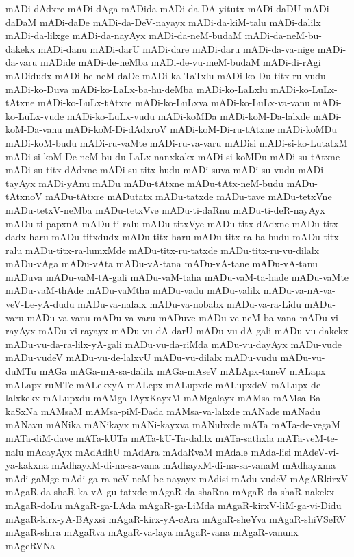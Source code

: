 {mADi-dAdxre
mADi-dAga
mADida
mADi-da-DA-yitutx
mADi-daDU
mADi-daDaM
mADi-daDe
mADi-da-DeV-nayayx
mADi-da-kiM-talu
mADi-dalilx
mADi-da-lilxge
mADi-da-nayAyx
mADi-da-neM-budaM
mADi-da-neM-bu-dakekx
mADi-danu
mADi-darU
mADi-dare
mADi-daru
mADi-da-va-nige
mADi-da-varu
mADide
mADi-de-neMba
mADi-de-vu-meM-budaM
mADi-di-rAgi
mADidudx
mADi-he-neM-daDe
mADi-ka-TaTxlu
mADi-ko-Du-titx-ru-vudu
mADi-ko-Duva
mADi-ko-LaLx-ba-hu-deMba
mADi-ko-LaLxlu
mADi-ko-LuLx-tAtxne
mADi-ko-LuLx-tAtxre
mADi-ko-LuLxva
mADi-ko-LuLx-va-vanu
mADi-ko-LuLx-vude
mADi-ko-LuLx-vudu
mADi-koMDa
mADi-koM-Da-lalxde
mADi-koM-Da-vanu
mADi-koM-Di-dAdxroV
mADi-koM-Di-ru-tAtxne
mADi-koMDu
mADi-koM-budu
mADi-ru-vaMte
mADi-ru-va-varu
mADisi
mADi-si-ko-LutatxM
mADi-si-koM-De-neM-bu-du-LaLx-nanxkakx
mADi-si-koMDu
mADi-su-tAtxne
mADi-su-titx-dAdxne
mADi-su-titx-hudu
mADi-suva
mADi-su-vudu
mADi-tayAyx
mADi-yAnu
mADu
mADu-tAtxne
mADu-tAtx-neM-budu
mADu-tAtxnoV
mADu-tAtxre
mADutatx
mADu-tatxde
mADu-tave
mADu-tetxVne
mADu-tetxV-neMba
mADu-tetxVve
mADu-ti-daRnu
mADu-ti-deR-nayAyx
mADu-ti-papxnA
mADu-ti-ralu
mADu-titxVye
mADu-titx-dAdxne
mADu-titx-dadx-haru
mADu-titxdudx
mADu-titx-haru
mADu-titx-ra-ba-hudu
mADu-titx-ralu
mADu-titx-ra-lumxMde
mADu-titx-ru-tatxde
mADu-titx-ru-vu-dilalx
mADu-vAga
mADu-vAta
mADu-vA-tana
mADu-vA-tane
mADu-vA-tanu
mADuva
mADu-vaM-tA-gali
mADu-vaM-taha
mADu-vaM-ta-hade
mADu-vaMte
mADu-vaM-thAde
mADu-vaMtha
mADu-vadu
mADu-valilx
mADu-va-nA-va-veV-Le-yA-dudu
mADu-va-nalalx
mADu-va-nobabx
mADu-va-ra-Lidu
mADu-varu
mADu-va-vanu
mADu-va-varu
mADuve
mADu-ve-neM-ba-vana
mADu-vi-rayAyx
mADu-vi-rayayx
mADu-vu-dA-darU
mADu-vu-dA-gali
mADu-vu-dakekx
mADu-vu-da-ra-lilx-yA-gali
mADu-vu-da-riMda
mADu-vu-dayAyx
mADu-vude
mADu-vudeV
mADu-vu-de-lalxvU
mADu-vu-dilalx
mADu-vudu
mADu-vu-duMTu
mAGa
mAGa-mA-sa-dalilx
mAGa-mAseV
mALApx-taneV
mALapx
mALapx-ruMTe
mALekxyA
mALepx
mALupxde
mALupxdeV
mALupx-de-lalxkekx
mALupxdu
mAMga-lAyxKayxM
mAMgalayx
mAMsa
mAMsa-Ba-kaSxNa
mAMsaM
mAMsa-piM-Dada
mAMsa-va-lalxde
mANade
mANadu
mANavu
mANika
mANikayx
mANi-kayxva
mANubxde
mATa
mATa-de-vegaM
mATa-diM-dave
mATa-kUTa
mATa-kU-Ta-dalilx
mATa-sathxla
mATa-veM-te-nalu
mAcayAyx
mAdAdhU
mAdAra
mAdaRvaM
mAdale
mAda-lisi
mAdeV-vi-ya-kakxna
mAdhayxM-di-na-sa-vana
mAdhayxM-di-na-sa-vanaM
mAdhayxma
mAdi-gaMge
mAdi-ga-ra-neV-neM-be-nayayx
mAdisi
mAdu-vudeV
mAgARkirxV
mAgaR-da-shaR-ka-vA-gu-tatxde
mAgaR-da-shaRna
mAgaR-da-shaR-nakekx
mAgaR-doLu
mAgaR-ga-LAda
mAgaR-ga-LiMda
mAgaR-kirxV-liM-ga-vi-Didu
mAgaR-kirx-yA-BAyxsi
mAgaR-kirx-yA-cAra
mAgaR-sheYva
mAgaR-shiVSeRV
mAgaR-shira
mAgaRva
mAgaR-va-laya
mAgaR-vana
mAgaR-vanunx
mAgeRVNa
}
